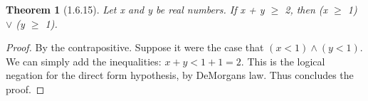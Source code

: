 \documentclass[a4paper, 12pt]{article}
\theoremstyle{plain}
\newtheorem*{theorem*}{Theorem}
\begin{document}
	
	\begin{theorem*}[1.6.15]
		Let x and y be real numbers. If x + y $\ge$ 2, then \newline (x $\ge$ 1) $\lor$ (y $\ge$ 1).
	\end{theorem*}
	
	\begin{proof}
		By the contrapositive. Suppose it were the case that \newline $(x < 1) \land (y < 1)$. We can simply add the inequalities: $x + y < 1 + 1 = 2$. This is the logical negation for the direct form hypothesis, by DeMorgans law. Thus concludes the proof.
	\end{proof}
\end{document}

